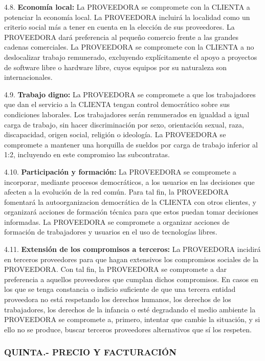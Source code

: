 \documentclass[11pt,spanish,a4paper,]{article}
\begin{document}
4.8. \textbf{Economía local:} La PROVEEDORA se compromete con la CLIENTA
a potenciar la economía local. La PROVEEDORA incluirá la localidad como
un criterio social más a tener en cuenta en la elección de sus
proveedores. La PROVEEDORA dará preferencia al pequeño comercio frente a
las grandes cadenas comerciales. La PROVEEDORA se compromete con la
CLIENTA a no deslocalizar trabajo remunerado, excluyendo explícitamente
el apoyo a proyectos de software libre o hardware libre, cuyos equipos
por su naturaleza son internacionales.

4.9. \textbf{Trabajo digno:} La PROVEEDORA se compromete a que los
trabajadores que dan el servicio a la CLIENTA tengan control democrático
sobre sus condiciones laborales. Los trabajadores serán remunerados en
igualdad a igual carga de trabajo, sin hacer discriminación por sexo,
orientación sexual, raza, discapacidad, origen social, religión o
ideología. La PROVEEDORA se compromete a mantener una horquilla de
sueldos por carga de trabajo inferior al 1:2, incluyendo en este
compromiso las subcontratas.

4.10. \textbf{Participación y formación:} La PROVEEDORA se compromete a
incorporar, mediante procesos democráticos, a los usuarios en las
decisiones que afecten a la evolución de la red común. Para tal fin, la
PROVEEDORA fomentará la autoorganizacion democrática de la CLIENTA con
otros clientes, y organizará acciones de formación técnica para que
estos puedan tomar decisiones informadas. La PROVEEDORA se compromete a
organizar acciones de formación de trabajadores y usuarios en el uso de
tecnologías libres.

4.11. \textbf{Extensión de los compromisos a terceros:} La PROVEEDORA
incidirá en terceros proveedores para que hagan extensivos los
compromisos sociales de la PROVEEDORA. Con tal fin, la PROVEEDORA se
compromete a dar preferencia a aquellos proveedores que cumplan dichos
compromisos. En casos en los que se tenga constancia o indicio
suficiente de que una tercera entidad proveedora no está respetando los
derechos humanos, los derechos de los trabajadores, los derechos de la
infancia o esté degradando el medio ambiente la PROVEEDORA se compromete
a, primero, intentar que cambie la situación, y si ello no se produce,
buscar terceros proveedores alternativos que sí los respeten.

\subsubsection{QUINTA.- PRECIO Y
FACTURACIÓN}\label{quinta.--precio-y-facturaciuxf3n}
\end{document}

